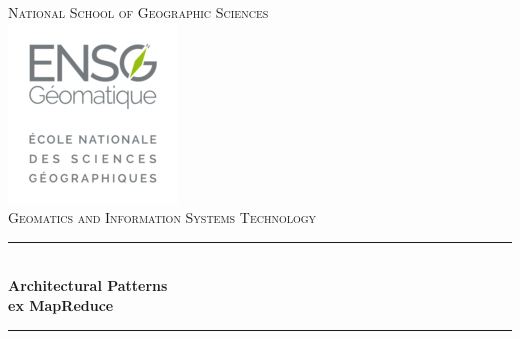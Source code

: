 \begin{titlepage}

\newcommand{\HRule}{\rule{\linewidth}{0.5mm}} %

\center %
 

\textsc{\LARGE National School of Geographic Sciences}\\[0.2cm] %


\includegraphics[scale=0.4]{../images/logo.png}\\[0.2cm] %
 

\textsc{\Large Geomatics and Information Systems Technology}\\[0.5cm] %


\HRule \\[0.4cm]
{ \huge \bfseries Architectural Patterns}\\[0.4cm] %
{ \bfseries ex MapReduce}\\[0.2cm] %
\HRule \\[1.5cm]
 

\end{titlepage}
